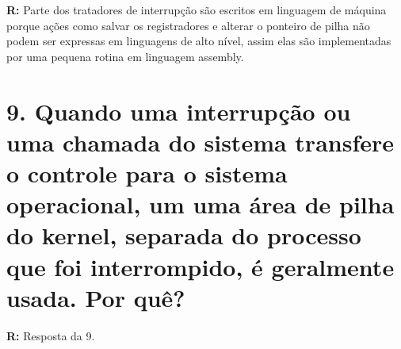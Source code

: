 \documentclass{article}
\begin{document}
\medskip
\noindent
\textbf{R:} Parte dos tratadores de interrupção são escritos em linguagem de máquina porque ações como salvar os registradores e alterar o ponteiro de pilha não podem ser expressas em linguagens de alto nível, assim elas são implementadas por uma pequena rotina em linguagem assembly.

\section*{9. \large Quando uma interrupção ou uma chamada do sistema transfere o controle para o sistema operacional, um uma área de pilha do kernel, separada do processo que foi interrompido, é geralmente usada. Por quê?}

\medskip
\noindent
\textbf{R: } Resposta da 9.
\end{document}
